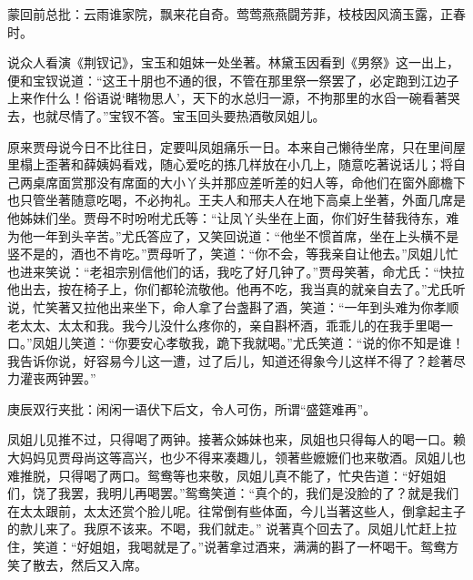\begin{parag}

    \begin{note}蒙回前总批：云雨谁家院，飘来花自奇。莺莺燕燕闘芳菲，枝枝因风滴玉露，正春时。\end{note}
\end{parag}

\begin{parag}

    说众人看演《荆钗记》，宝玉和姐妹一处坐著。林黛玉因看到《男祭》这一出上，便和宝钗说道：“这王十朋也不通的很，不管在那里祭一祭罢了，必定跑到江边子上来作什么！俗语说‘睹物思人’，天下的水总归一源，不拘那里的水舀一碗看著哭去，也就尽情了。”宝钗不答。宝玉回头要热酒敬凤姐儿。
\end{parag}


\begin{parag}


    原来贾母说今日不比往日，定要叫凤姐痛乐一日。本来自己懒待坐席，只在里间屋里榻上歪著和薛姨妈看戏，随心爱吃的拣几样放在小几上，随意吃著说话儿；将自己两桌席面赏那没有席面的大小丫头并那应差听差的妇人等，命他们在窗外廊檐下也只管坐著随意吃喝，不必拘礼。王夫人和邢夫人在地下高桌上坐著，外面几席是他姊妹们坐。贾母不时吩咐尤氏等：“让凤丫头坐在上面，你们好生替我待东，难为他一年到头辛苦。”尤氏答应了，又笑回说道：“他坐不惯首席，坐在上头横不是竖不是的，酒也不肯吃。”贾母听了，笑道：“你不会，等我亲自让他去。”凤姐儿忙也进来笑说：“老祖宗别信他们的话，我吃了好几钟了。”贾母笑著，命尤氏：“快拉他出去，按在椅子上，你们都轮流敬他。他再不吃，我当真的就亲自去了。”尤氏听说，忙笑著又拉他出来坐下，命人拿了台盏斟了酒，笑道：“一年到头难为你孝顺老太太、太太和我。我今儿没什么疼你的，亲自斟杯酒，乖乖儿的在我手里喝一口。”凤姐儿笑道：“你要安心孝敬我，跪下我就喝。”尤氏笑道：“说的你不知是谁！我告诉你说，好容易今儿这一遭，过了后儿，知道还得象今儿这样不得了？趁著尽力灌丧两钟罢。”\begin{note}庚辰双行夹批：闲闲一语伏下后文，令人可伤，所谓“盛筵难再”。\end{note}凤姐儿见推不过，只得喝了两钟。接著众姊妹也来，凤姐也只得每人的喝一口。赖大妈妈见贾母尚这等高兴，也少不得来凑趣儿，领著些嬷嬷们也来敬酒。凤姐儿也难推脱，只得喝了两口。鸳鸯等也来敬，凤姐儿真不能了，忙央告道：“好姐姐们，饶了我罢，我明儿再喝罢。”鸳鸯笑道：“真个的，我们是没脸的了？就是我们在太太跟前，太太还赏个脸儿呢。往常倒有些体面，今儿当著这些人，倒拿起主子的款儿来了。我原不该来。不喝，我们就走。” 说著真个回去了。凤姐儿忙赶上拉住，笑道：“好姐姐，我喝就是了。”说著拿过酒来，满满的斟了一杯喝干。鸳鸯方笑了散去，然后又入席。
\end{parag}


